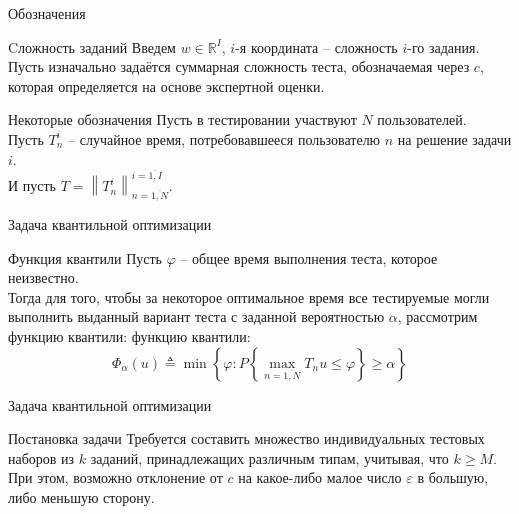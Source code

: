 \documentclass[aspectratio=169]{beamer}
\newcommand{\norm}[1]{\left\lVert#1\right\rVert}
\begin{document}
    \begin{frame}{Обозначения}
        \begin{block}{Cложность заданий}
            Введем $w\in\mathbb{R}^I$, $i$-я координата -- сложность $i$-го задания.\\
            Пусть изначально задаётся суммарная сложность теста, обозначаемая через $c$, которая определяется на основе экспертной оценки.
        \end{block}
    
        \begin{block}{Некоторые обозначения}
            Пусть в тестировании участвуют $N$ пользователей.\\
            Пусть $T_n^i$ -- случайное время, потребовавшееся пользователю $n$ на решение задачи $i$.\\
            И пусть $ T = \norm{ T_n^i }_{n=\overline{1,N}}^{i=\overline{1,I}}$.
        \end{block}
    \end{frame}
    
    
    \begin{frame}{Задача квантильной оптимизации}
        \begin{block}{Функция квантили}
            Пусть $\varphi$ -- общее время выполнения теста, которое неизвестно.\\
            Тогда для того, чтобы за некоторое оптимальное время все тестируемые могли выполнить выданный вариант теста с заданной вероятностью $\alpha$, рассмотрим функцию квантили:
            функцию квантили:
            \begin{equation}
                \Phi_\alpha(u)\triangleq\min\left\{\varphi:P\left\{\max_{n=\overline{1,N}}T_n u\leq\varphi\right\}\geq\alpha\right\}
            \end{equation}
        \end{block}
    \end{frame}
    
    
    \begin{frame}{Задача квантильной оптимизации}
        \begin{block}{Постановка задачи}
            Требуется составить множество индивидуальных тестовых наборов из $k$ заданий, принадлежащих различным типам, учитывая, что $k \geq M$.\\
            При этом, возможно отклонение от $c$ на какое-либо малое число $\varepsilon$ в большую, либо меньшую сторону.
        \end{block}
    \end{frame}
\end{document}
